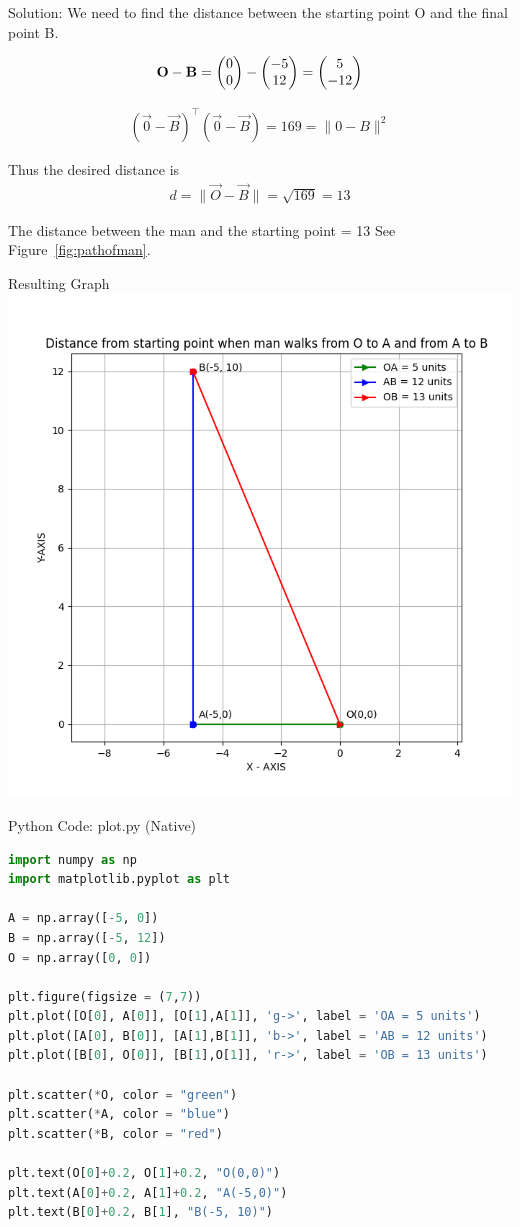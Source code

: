 \documentclass{beamer}
\begin{document}
\begin{frame}{Solution: }
\noindent
We need to find the distance between the starting point O and the final point B.

\begin{align}
    \mathbf{O} - \mathbf{B} = \begin{pmatrix}0 \\ 0\end{pmatrix} - \begin{pmatrix}-5 \\ 12\end{pmatrix} = \begin{pmatrix}5 \\ -12\end{pmatrix}
\end{align}

\begin{align}
    (\vec{0} - \vec{B})^\top(\vec{0} - \vec{B}) = 169 = \|0 - B\|^2
\end{align}

Thus the desired distance is
\begin{align}
    d = \|\vec{O} - \vec{B}\| = \sqrt{169} = 13
\end{align}

The distance between the man and the starting point = 13
See Figure~\ref{fig:pathofman}.

\end{frame}

\begin{frame}{Resulting Graph}
\centering
\includegraphics[width=0.6\linewidth]{figs/fig2.png}
\caption{}
\label{fig:pathofman}
\end{frame}

\begin{frame}[fragile]{Python Code: plot.py (Native)}
\begin{lstlisting}[language=Python]
import numpy as np
import matplotlib.pyplot as plt

A = np.array([-5, 0])
B = np.array([-5, 12])
O = np.array([0, 0])

plt.figure(figsize = (7,7))
plt.plot([O[0], A[0]], [O[1],A[1]], 'g->', label = 'OA = 5 units')
plt.plot([A[0], B[0]], [A[1],B[1]], 'b->', label = 'AB = 12 units')
plt.plot([B[0], O[0]], [B[1],O[1]], 'r->', label = 'OB = 13 units')

plt.scatter(*O, color = "green")
plt.scatter(*A, color = "blue")
plt.scatter(*B, color = "red")

plt.text(O[0]+0.2, O[1]+0.2, "O(0,0)")
plt.text(A[0]+0.2, A[1]+0.2, "A(-5,0)")
plt.text(B[0]+0.2, B[1], "B(-5, 10)")
\end{lstlisting}
\end{frame}
\end{document}
